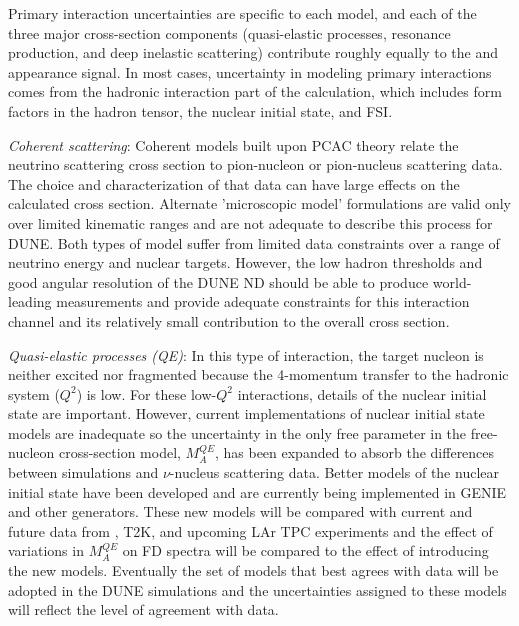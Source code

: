 Primary interaction uncertainties are specific to each model, and each of the three major
cross-section components (quasi-elastic processes, resonance production, and deep inelastic scattering)
contribute roughly equally to the \nue and \anue
appearance signal. In most cases, uncertainty in modeling primary interactions comes from the
hadronic interaction part of the calculation, which includes form factors in the hadron tensor,
the nuclear initial state, and FSI. 

  \emph{Coherent scattering}: Coherent models built upon PCAC theory relate the neutrino scattering 
  cross section to pion-nucleon or pion-nucleus scattering data. The choice and characterization
  of that data can have large effects on the calculated cross section. Alternate 'microscopic model' 
  formulations are valid only over limited kinematic ranges and are not adequate to describe this process 
  for DUNE. Both types of model suffer from limited data constraints over a range of neutrino energy
  and nuclear targets.
  However, the low hadron thresholds and good angular resolution of the DUNE ND should be able
  to produce world-leading measurements and provide adequate constraints for this interaction channel and 
  its relatively small contribution to the overall cross section.

  \emph{Quasi-elastic processes (QE)}: In this type of interaction, the target nucleon 
  is neither excited nor fragmented because the 4-momentum transfer to the hadronic system ($Q^{2}$) is low.
  For these low-$Q^{2}$ interactions, details of the nuclear initial state are important. However,
  current implementations of nuclear initial state models are inadequate so the uncertainty in the only
  free parameter in the free-nucleon cross-section model, $M_{A}^{QE}$, has been expanded to absorb the
  differences between simulations and $\nu$-nucleus scattering data. Better models of the nuclear
  initial state have been developed
  and are currently being implemented in GENIE and other generators. These new models will be compared with current 
  and future data from \minerva, T2K, and upcoming LAr TPC experiments and the effect of variations in $M_{A}^{QE}$
  on FD spectra will be compared to the effect of introducing the new models.
  Eventually the set of models that best agrees with data will be adopted in the DUNE simulations and
  the uncertainties assigned to these models will reflect the level of agreement with data.

